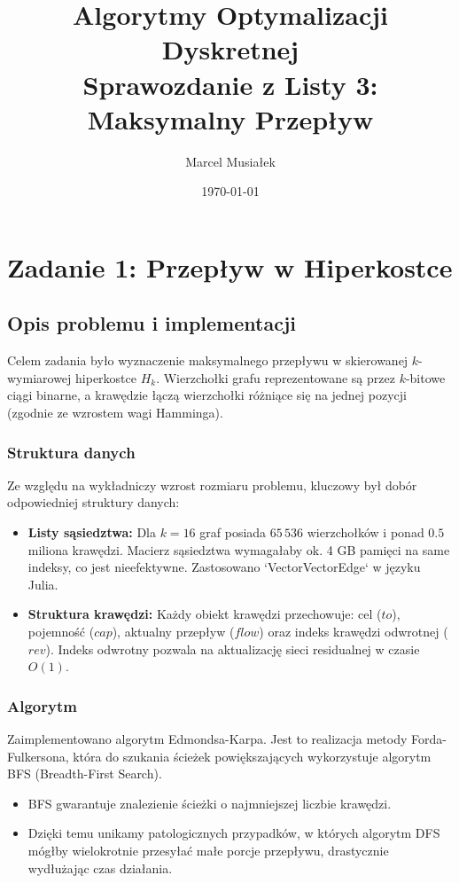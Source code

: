 \documentclass[11pt, a4paper]{article}
\title{\textbf{Algorytmy Optymalizacji Dyskretnej} \\ Sprawozdanie z Listy 3: Maksymalny Przepływ}
\author{Marcel Musiałek}
\date{\today}
\begin{document}
\maketitle
\tableofcontents
\newpage

\section{Zadanie 1: Przepływ w Hiperkostce}

\subsection{Opis problemu i implementacji}
Celem zadania było wyznaczenie maksymalnego przepływu w skierowanej $k$-wymiarowej hiperkostce $H_k$. Wierzchołki grafu reprezentowane są przez $k$-bitowe ciągi binarne, a krawędzie łączą wierzchołki różniące się na jednej pozycji (zgodnie ze wzrostem wagi Hamminga).

\subsubsection{Struktura danych}
Ze względu na wykładniczy wzrost rozmiaru problemu, kluczowy był dobór odpowiedniej struktury danych:
\begin{itemize}
    \item \textbf{Listy sąsiedztwa:} Dla $k=16$ graf posiada $65\,536$ wierzchołków i ponad $0.5$ miliona krawędzi. Macierz sąsiedztwa wymagałaby ok. 4 GB pamięci na same indeksy, co jest nieefektywne. Zastosowano `Vector{Vector{Edge}}` w języku Julia.
    \item \textbf{Struktura krawędzi:} Każdy obiekt krawędzi przechowuje: cel ($to$), pojemność ($cap$), aktualny przepływ ($flow$) oraz indeks krawędzi odwrotnej ($rev$). Indeks odwrotny pozwala na aktualizację sieci residualnej w czasie $O(1)$.
\end{itemize}

\subsubsection{Algorytm}
Zaimplementowano algorytm Edmondsa-Karpa. Jest to realizacja metody Forda-Fulkersona, która do szukania ścieżek powiększających wykorzystuje algorytm BFS (Breadth-First Search).
\begin{itemize}
    \item BFS gwarantuje znalezienie ścieżki o najmniejszej liczbie krawędzi.
    \item Dzięki temu unikamy patologicznych przypadków, w których algorytm DFS mógłby wielokrotnie przesyłać małe porcje przepływu, drastycznie wydłużając czas działania.
\end{itemize}
\end{document}
